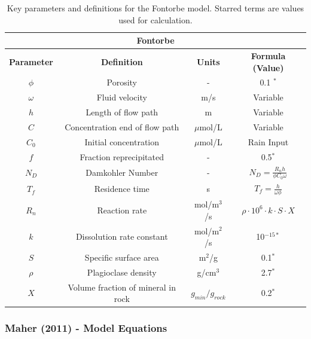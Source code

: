 \begin{table}[H]
    \centering
    \renewcommand{\arraystretch}{1.1} %
    \begin{tabular}{|c|c|c|c|}
        \hline
        \multicolumn{4}{|c|}{\textbf{Fontorbe}} \\  
        \hline
        \textbf{Parameter} & \textbf{Definition} & \textbf{Units} & \textbf{Formula (Value)} \\  
        \hline
        $\phi$ & Porosity & - & 0.1 $^*$\\
        $\omega$ & Fluid velocity & m/s & Variable \\
        $h$ & Length of flow path & m & Variable \\
        $C$ & Concentration \@ end of flow path & $\mu$mol/L & Variable \\
        $C_0$ & Initial concentration & $\mu$mol/L & Rain Input \\
        $f$ & Fraction reprecipitated & - & 0.5$^*$ \\
        $N_D$ & Damkohler Number & - & $N_D = \frac{R_n h}{\phi C_0 \omega}$ \\
        $T_f$ & Residence time & s & $T_f = \frac{h}{\omega\phi}$ \\
        $R_n$ & Reaction rate & mol/m$^3$/s & $\rho \cdot 10^6 \cdot k \cdot S \cdot X $ \\
        $k$ & Dissolution rate constant & mol/m$^2$/s & 10$^{-15*}$ \\
        $S$ & Specific surface area & m$^2$/g & 0.1$^*$ \\
        $\rho$ & Plagioclase density & g/cm$^3$ & 2.7$^*$ \\
        $X$ & Volume fraction of mineral in rock & $g_{min}/g_{rock}$ & 0.2$^*$ \\
        \hline
    \end{tabular}
    \caption{Key parameters and definitions for the Fontorbe model. Starred terms are values used for calculation.}
    \label{tab:fontorbe1}
\end{table}


\FloatBarrier









\newpage




\subsubsection*{Maher (2011) - Model Equations}

